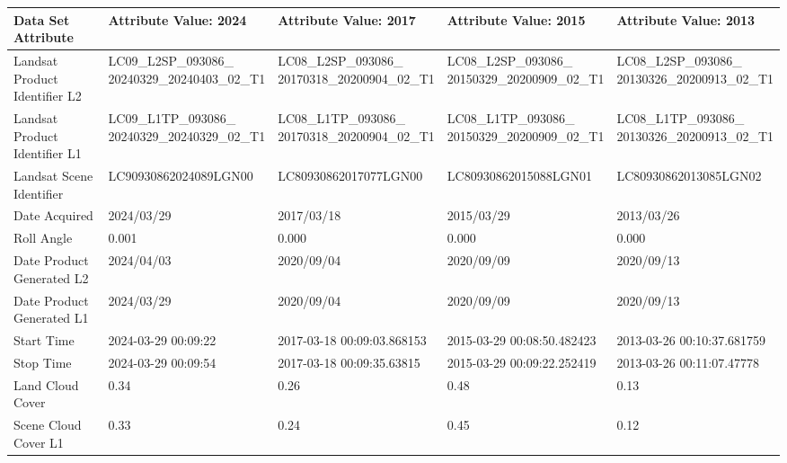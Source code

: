 \documentclass[jmse,article,submit,pdftex,moreauthors]{Definitions/mdpi}
\begin{document}
\begin{table}
\centering
\small{
 \begin{tabular}{|l|l|l|l|l|}
    \hline
        \textbf{Data Set Attribute} & \textbf{Attribute Value: 2024} & \textbf{Attribute Value: 2017} & \textbf{Attribute Value: 2015} & \textbf{Attribute Value: 2013} \\ \hline
        \toprule
        Landsat Product Identifier L2 & \makecell{LC09\_L2SP\_093086\_ \\ 20240329\_20240403\_02\_T1} & \makecell{LC08\_L2SP\_093086\_ \\ 20170318\_20200904\_02\_T1} & \makecell{LC08\_L2SP\_093086\_ \\ 20150329\_20200909\_02\_T1} & \makecell{LC08\_L2SP\_093086\_ \\ 20130326\_20200913\_02\_T1} \\ \hline
        Landsat Product Identifier L1 & \makecell{LC09\_L1TP\_093086\_ \\ 20240329\_20240329\_02\_T1} & \makecell{LC08\_L1TP\_093086\_ \\ 20170318\_20200904\_02\_T1} & \makecell{LC08\_L1TP\_093086\_ \\ 20150329\_20200909\_02\_T1} & \makecell{LC08\_L1TP\_093086\_ \\ 20130326\_20200913\_02\_T1} \\ \hline
        Landsat Scene Identifier & LC90930862024089LGN00 & LC80930862017077LGN00 & LC80930862015088LGN01 & LC80930862013085LGN02 \\ \hline
        Date Acquired & 2024/03/29 & 2017/03/18 & 2015/03/29 & 2013/03/26 \\ \hline
        Roll Angle & 0.001 & 0.000 & 0.000 & 0.000 \\ \hline
        Date Product Generated L2 & 2024/04/03 & 2020/09/04 & 2020/09/09 & 2020/09/13 \\ \hline
        Date Product Generated L1 & 2024/03/29 & 2020/09/04 & 2020/09/09 & 2020/09/13 \\ \hline
        Start Time & 2024-03-29 00:09:22 & 2017-03-18 00:09:03.868153 & 2015-03-29 00:08:50.482423 & 2013-03-26 00:10:37.681759 \\ \hline
        Stop Time & 2024-03-29 00:09:54 & 2017-03-18 00:09:35.63815 & 2015-03-29 00:09:22.252419 & 2013-03-26 00:11:07.47778 \\ \hline
        Land Cloud Cover & 0.34 & 0.26 & 0.48 & 0.13 \\ \hline
        Scene Cloud Cover L1 & 0.33 & 0.24 & 0.45 & 0.12 \\ \hline

\end{tabular}}
\end{table}
\end{document}
